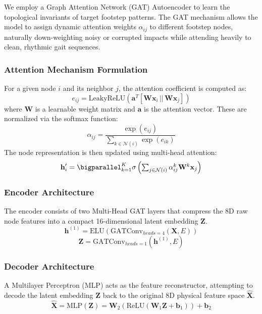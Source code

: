 \documentclass[conference, a4paper]{IEEEtran}
\begin{document}
We employ a Graph Attention Network (GAT) Autoencoder to learn the topological invariants of target footstep patterns. The GAT mechanism allows the model to assign dynamic attention weights $\alpha_{ij}$ to different footstep nodes, naturally down-weighting noisy or corrupted impacts while attending heavily to clean, rhythmic gait sequences.

\subsubsection{Attention Mechanism Formulation}
For a given node $i$ and its neighbor $j$, the attention coefficient is computed as:
\begin{equation}
    e_{ij} = \text{LeakyReLU}\left(\mathbf{a}^T [\mathbf{W}\mathbf{x}_i \,||\, \mathbf{W}\mathbf{x}_j]\right)
\end{equation}
where $\mathbf{W}$ is a learnable weight matrix and $\mathbf{a}$ is the attention vector. These are normalized via the softmax function:
\begin{equation}
    \alpha_{ij} = \frac{\exp(e_{ij})}{\sum_{k \in \mathcal{N}(i)} \exp(e_{ik})}
\end{equation}
The node representation is then updated using multi-head attention:
\begin{equation}
    \mathbf{h}_i' = \textstyle\bigparallel_{k=1}^{K} \sigma \left( \sum_{j \in \mathcal{N}(i)} \alpha_{ij}^k \mathbf{W}^k \mathbf{x}_j \right)
\end{equation}

\subsubsection{Encoder Architecture}
The encoder consists of two Multi-Head GAT layers that compress the 8D raw node features into a compact 16-dimensional latent embedding $\mathbf{Z}$.
\begin{equation}
    \mathbf{h}^{(1)} = \text{ELU} \left( \text{GATConv}_{heads=4}(\mathbf{X}, E) \right)
\end{equation}
\begin{equation}
    \mathbf{Z} = \text{GATConv}_{heads=1}(\mathbf{h}^{(1)}, E)
\end{equation}

\subsubsection{Decoder Architecture}
A Multilayer Perceptron (MLP) acts as the feature reconstructor, attempting to decode the latent embedding $\mathbf{Z}$ back to the original 8D physical feature space $\mathbf{\hat{X}}$.
\begin{equation}
    \mathbf{\hat{X}} = \text{MLP}(\mathbf{Z}) = \mathbf{W}_2(\text{ReLU}(\mathbf{W}_1\mathbf{Z} + \mathbf{b}_1)) + \mathbf{b}_2
\end{equation}
\end{document}
